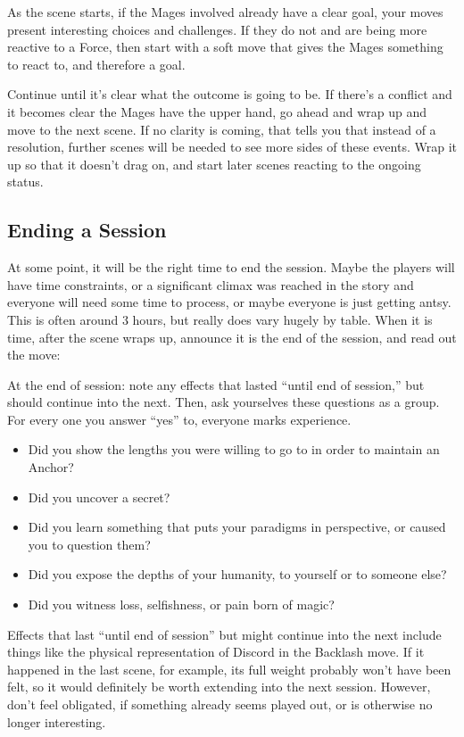 \documentclass[
  oneside,
  statementpaper,
  9pt]{memoir}
\begin{document}
As the scene starts, if the Mages involved already have a clear goal,
your moves present interesting choices and challenges. If they do not
and are being more reactive to a Force, then start with a soft move that
gives the Mages something to react to, and therefore a goal.

Continue until it's clear what the outcome is going to be. If there's a
conflict and it becomes clear the Mages have the upper hand, go ahead
and wrap up and move to the next scene. If no clarity is coming, that
tells you that instead of a resolution, further scenes will be needed to
see more sides of these events. Wrap it up so that it doesn't drag on,
and start later scenes reacting to the ongoing status.

\hypertarget{ending-a-session}{%
\subsection{Ending a Session}\label{ending-a-session}}

At some point, it will be the right time to end the session. Maybe the
players will have time constraints, or a significant climax was reached
in the story and everyone will need some time to process, or maybe
everyone is just getting antsy. This is often around 3 hours, but really
does vary hugely by table. When it is time, after the scene wraps up,
announce it is the end of the session, and read out the move:

At the end of session: note any effects that lasted ``until end of
session,'' but should continue into the next. Then, ask yourselves these
questions as a group. For every one you answer ``yes'' to, everyone
marks experience.

\begin{itemize}
\item
  Did you show the lengths you were willing to go to in order to
  maintain an Anchor?
\item
  Did you uncover a secret?
\item
  Did you learn something that puts your paradigms in perspective, or
  caused you to question them?
\item
  Did you expose the depths of your humanity, to yourself or to someone
  else?
\item
  Did you witness loss, selfishness, or pain born of magic?
\end{itemize}

Effects that last ``until end of session'' but might continue into the
next include things like the physical representation of Discord in the
Backlash move. If it happened in the last scene, for example, its full
weight probably won't have been felt, so it would definitely be worth
extending into the next session. However, don't feel obligated, if
something already seems played out, or is otherwise no longer
interesting.
\end{document}
